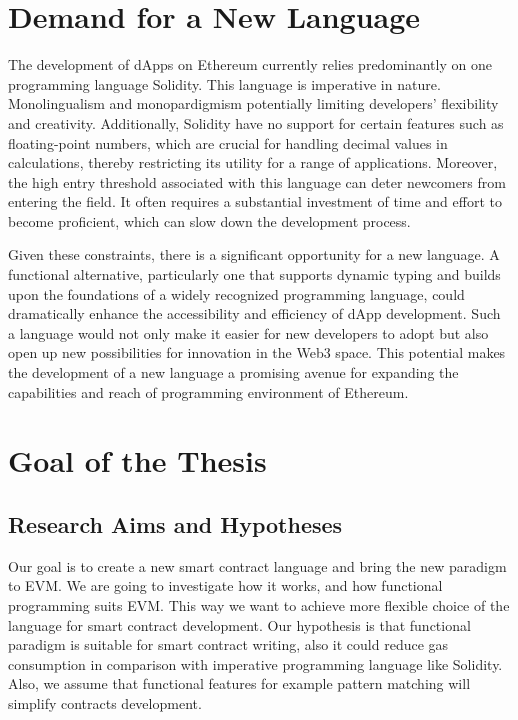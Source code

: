 \section{Demand for a New Language}

The development of dApps on Ethereum currently relies predominantly on one programming language Solidity. This language is imperative in nature. Monolingualism and monopardigmism potentially limiting developers' flexibility and creativity. Additionally, Solidity have no support for certain features such as floating-point numbers, which are crucial for handling decimal values in calculations, thereby restricting its utility for a range of applications. Moreover, the high entry threshold associated with this language can deter newcomers from entering the field. It often requires a substantial investment of time and effort to become proficient, which can slow down the development process.

Given these constraints, there is a significant opportunity for a new language. A functional alternative, particularly one that supports dynamic typing and builds upon the foundations of a widely recognized programming language, could dramatically enhance the accessibility and efficiency of dApp development. Such a language would not only make it easier for new developers to adopt but also open up new possibilities for innovation in the Web3 space. This potential makes the development of a new language a promising avenue for expanding the capabilities and reach of programming environment of Ethereum.

\section{Goal of the Thesis}

\subsection{Research Aims and Hypotheses}
Our goal is to create a new smart contract language and bring the new paradigm to EVM. We are going to investigate how it works, and how functional programming suits EVM. This way we want to achieve more flexible choice of the language for smart contract development.
Our hypothesis is that functional paradigm is suitable for smart contract writing, also it could reduce gas consumption in comparison with imperative programming language like Solidity. Also, we assume that functional features for example pattern matching will simplify contracts development.


